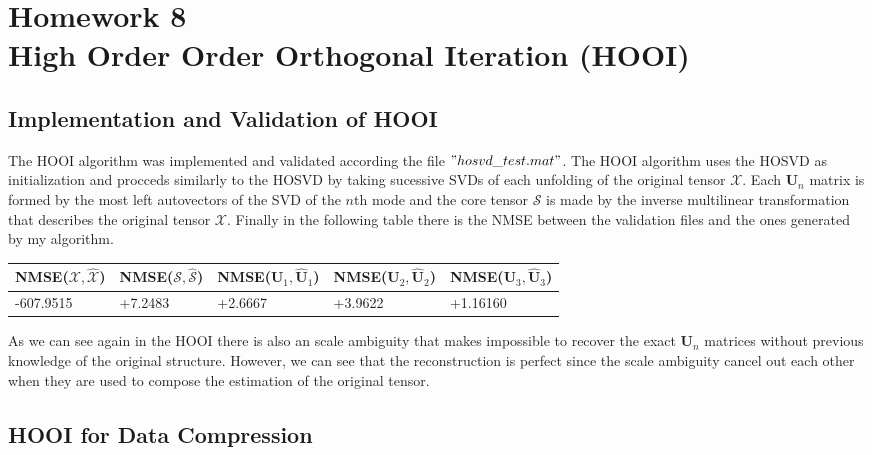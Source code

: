\documentclass[a4paper,10pt]{article}
\begin{document}
\newpage
\section*{Homework 8 \\ High Order Order Orthogonal Iteration (HOOI)}

    \subsection*{Implementation and Validation of HOOI}

    The HOOI algorithm was implemented and validated according the file $"hosvd\_test.mat"$. The HOOI algorithm uses the HOSVD as initialization and procceds similarly to the HOSVD by taking sucessive
    SVDs of each unfolding of the original tensor $\mathcal{X}$. Each $\boldsymbol{U}_{n}$ matrix is formed by the most left autovectors of the SVD of the $n$th mode and the core tensor 
    $\mathcal{S}$ is made by the inverse multilinear transformation that describes the original tensor $\mathcal{X}$. Finally in the following table there is the NMSE between
    the validation files and the ones generated by my algorithm. 

    \begin{table}[ht!]
        \centering
        \begin{tabular}{|l|l|l|l|l|}
        \hline
        NMSE($\mathcal{X}, \mathcal{\hat{X}}$) & NMSE($\mathcal{S}, \mathcal{\hat{S}}$) & NMSE($\boldsymbol{U}_{1}, \boldsymbol{\hat{U}}_{1}$) & NMSE($\boldsymbol{U}_{2}, \boldsymbol{\hat{U}}_{2}$) & NMSE($\boldsymbol{U}_{3}, \boldsymbol{\hat{U}}_{3}$) \\ \hline
        -607.9515 & +7.2483 & +2.6667 & +3.9622 & +1.16160 \\ \hline
        \end{tabular}
    \end{table}

    As we can see again in the HOOI there is also an scale ambiguity that makes impossible to recover the exact 
    $\boldsymbol{U}_{n}$ matrices without previous knowledge of the original structure. However, we can see that the reconstruction is perfect since the scale ambiguity cancel out each
    other when they are used to compose the estimation of the original tensor.

    \subsection*{HOOI for Data Compression}
\end{document}
